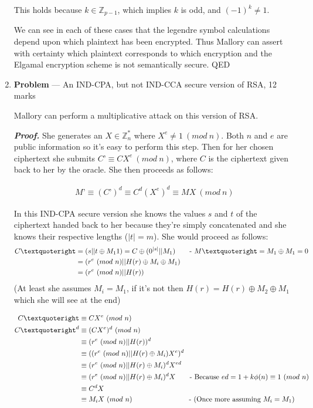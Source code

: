\documentclass[11pt]{article}
\theoremstyle{definition}
\newcounter{problem}
\newcommand{\Z}{\mathbb{Z}}
\begin{document}
\begin{enumerate}
This holds because $k \in \Z_{p-1}$, which implies $k$ is odd, and $(-1)^k \ne 1$. 		

We can see in each of these cases that the legendre symbol calculations depend upon which plaintext has been encrypted. Thus Mallory can assert with certainty which plaintext corresponds to which encryption and the Elgamal encryption scheme is not semantically secure. QED

\newpage


\item[] \textbf{Problem \theproblem} --- An IND-CPA, but not IND-CCA secure version of RSA, 12
    marks

Mallory can perform a multiplicative attack on this version of RSA. 

\textbf{\emph{Proof.}} She generates an $X \in \Z_n^*$ where $X^e \ne 1\ (mod\ n)$. Both $n$ and $e$ are public information so it’s easy to perform this step. Then for her chosen ciphertext she submits $C’ \equiv CX^e\ (mod\ n)$, where $C$ is the ciphertext given back to her by the oracle. She then proceeds as follows:

\begin{align*}
M’ \equiv (C’)^d \equiv C^d(X^e)^d \equiv MX\ (mod\ n)
\end{align*}

In this IND-CPA secure version she knows the values $s$ and $t$ of the ciphertext handed back to her because they’re simply concatenated and she knows their respective lengths ($|t| = m$). She would proceed as follows:
\begin{align*}
C’ &= (s || t \oplus M_11) = C \oplus (0^{|s|} || M_1)		\text{\qquad- $M’ = M_1 \oplus M_1 = 0$} \\
&= (r^e\ (mod\ n) || H(r) \oplus M_i \oplus M_1) \\
&= (r^e\ (mod\ n) || H(r))		 
\end{align*}
(At least she assumes $M_i = M_1$, if it’s not then $H(r) = H(r) \oplus M_2 \oplus M_1$ which she will see at the end)

\begin{align*}	
C’ &\equiv CX^e\ (mod\ n) \\
C’^d &\equiv (CX^e)^d\ (mod\ n) \\
&\equiv (r^e\ (mod\ n) || H(r))^d \\
&\equiv ((r^e\ (mod\ n) || H(r) \oplus M_i)X^e)^d \\
&\equiv (r^e\ (mod\ n) || H(r) \oplus M_i)^dX^{ed} \\ 
&\equiv (r^e\ (mod\ n) || H(r) \oplus M_i)^dX 				\text{\qquad- Because $ed = 1 + k\phi(n) \equiv 1\ (mod\ n)$} \\
&\equiv C^dX \\
&\equiv M_iX\ (mod\ n)							\text{\qquad\qquad\qquad\qquad- (Once more assuming $M_i = M_1$)}
\end{align*}


\end{enumerate}
\end{document}

